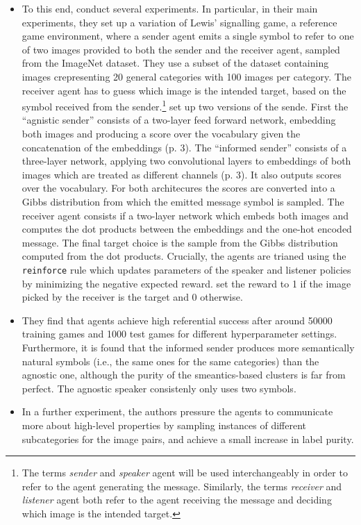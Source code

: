 \begin{itemize}
	\item To this end, \textcite{lazaridou2016multi} conduct several experiments. In particular, in their main experiments, they set up a variation of Lewis' signalling game, a reference game environment, where a sender agent emits a single symbol to refer to one of two images provided to both the sender and the receiver agent, sampled from the ImageNet dataset. They use a subset of the dataset containing images crepresenting 20 general categories with 100 images per category. The receiver agent has to guess  which image is the intended target, based on the symbol received from the sender.\footnote{The terms \textit{sender} and \textit{speaker} agent will be used interchangeably in order to refer to the agent generating the message. Similarly, the terms \textit{receiver} and \textit{listener} agent both refer to the agent receiving the message and deciding which image is the intended target.} \textcite{lazaridou2016multi} set up two versions of the sende. First the ``agnistic sender'' consists of a two-layer feed forward network, embedding both images and producing a score over the vocabulary given the concatenation of the embeddings (p. 3). The ``informed sender'' consists of a three-layer network, applying two convolutional layers to embeddings of both images which are treated as different channels (p. 3). It also outputs scores over the vocabulary. For both architecures the scores are converted into a Gibbs distribution from which the emitted  message symbol is sampled. The receiver agent consists if a two-layer network which embeds both images and computes the dot products between the embeddings and the one-hot encoded message. The final target choice is the sample from the Gibbs distribution computed from the dot products. Crucially, the agents are trianed using the \texttt{reinforce} rule which updates parameters of the speaker and listener policies by minimizing the negative expected reward. \textcite{lazaridou2016multi} set the reward to 1 if the image picked by the receiver is the target and 0 otherwise. 
	\item They find that agents achieve high referential success after around 50000 training games and 1000 test games for different hyperparameter settings. Furthermore, it is found that the informed sender produces more semantically natural symbols (i.e., the same ones for the same categories) than the agnostic one, although the purity of the smeantics-based clusters is far from perfect. The agnostic speaker consistenly only uses two symbols. 
	\item In a further experiment, the authors pressure the agents to communicate more about high-level properties by sampling instances of different subcategories for the image pairs, and achieve a small increase in label purity. 

\end{itemize}
